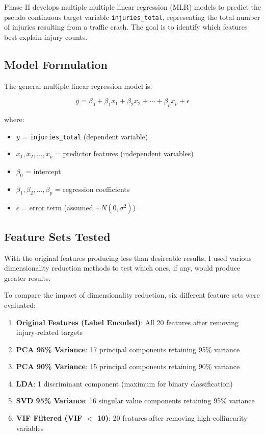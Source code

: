 \documentclass[stu,12pt,floatsintext]{apa7}
\begin{document}
Phase II develops multiple multiple linear regression (MLR) models to predict the pseudo continuous target variable \texttt{injuries\_total}, 
representing the total number of injuries resulting from a traffic crash. The goal is to identify which features best explain injury counts.

\subsection{Model Formulation}

The general multiple linear regression model is:

\begin{equation}
y = \beta_0 + \beta_1 x_1 + \beta_2 x_2 + \cdots + \beta_p x_p + \epsilon
\end{equation}

where:
\begin{itemize}
    \item $y$ = \texttt{injuries\_total} (dependent variable)
    \item $x_1, x_2, \ldots, x_p$ = predictor features (independent variables)
    \item $\beta_0$ = intercept
    \item $\beta_1, \beta_2, \ldots, \beta_p$ = regression coefficients
    \item $\epsilon$ = error term (assumed $\sim N(0, \sigma^2)$)
\end{itemize}

\subsection{Feature Sets Tested}

With the original features producing less than desireable results, I used various 
dimensionality reduction methods to test which ones, if any, would produce greater results.

To compare the impact of dimensionality reduction, six different feature sets were evaluated:

\begin{enumerate}
    \item \textbf{Original Features (Label Encoded)}: All 20 features after removing injury-related targets
    \item \textbf{PCA 95\% Variance}: 17 principal components retaining 95\% variance
    \item \textbf{PCA 90\% Variance}: 15 principal components retaining 90\% variance
    \item \textbf{LDA}: 1 discriminant component (maximum for binary classification)
    \item \textbf{SVD 95\% Variance}: 16 singular value components retaining 95\% variance
    \item \textbf{VIF Filtered (VIF $<$ 10)}: 20 features after removing high-collinearity variables
\end{enumerate}
\end{document}
